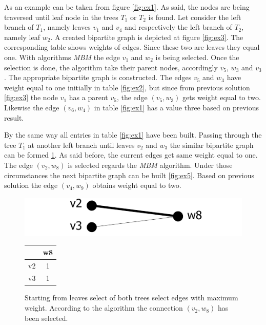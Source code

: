 \documentclass{report}
\begin{document}
As an example can be taken from figure \ref{fig:ex1}. As said, the nodes are being traversed until leaf node in the trees $ T_{1}$ or $ T_{2}$ is found. Let consider the left branch of $ T_{1}$, namely leaves $v_{1}$ and $v_{4}$ and respectively the left branch of $ T_{2}$, namely leaf $w_{2}$. A created bipartite graph is depicted at figure  \ref{fig:ex3}. The corresponding table shows weights of edges. Since these two are leaves they equal one. With algorithms \emph{MBM} the edge $v_{1}$ and $w_{2}$ is being selected. Once the selection is done, the algorithm take their parent nodes, accordingly $v_{5}$, $w_{3}$ and $v_{3}$. The appropriate bipartite graph is constructed. The edges  $v_{5}$ and $w_{3}$ have weight equal to one initially in table \ref{fig:ex2}, but since from previous solution \ref{fig:ex3}  the node $v_{1}$ has a parent $v_{5}$, the edge $(v_{5},w_{3})$ gets weight equal to two. Likewise the edge  $(v_{6},w_{4})$ in table \ref{fig:ex1} has a value three based on previous result.

By the same way all entries in table \ref{fig:ex1} have been built. Passing through the tree $ T_{1}$ at another left branch until leaves $v_{2}$ and $w_{3}$ the similar bipartite graph can be formed \ref{fig:ex6}. As said before, the current edges get same weight equal to one. The edge $(v_{2},w_{8})$ is selected regards the \emph{MBM} algorithm. Under those circumstances the next bipartite graph can be built \ref{fig:ex5}. Based on previous solution the edge $(v_{4},w_{9})$ obtains weight equal to two.

\begin{figure}[h]
  \begin{minipage}[h]{0.60\linewidth}
    \centering
    \includegraphics[scale=0.95]{Figures/algorithms/TD/6ex.pdf}\\[0.1cm]
  \end{minipage}%
  \begin{minipage}[b]{0.30\linewidth}
    \centering
\begin{tabular}{|c|c|}
\hline
   & w8 \\ \hline
v2 & \cellcolor[gray]{0.9} 1  \\ \hline
v3 & 1  \\ \hline
\end{tabular}
\end{minipage}
\caption{Starting from leaves select of both trees select edges with maximum weight. According to the algorithm the connection $(v_{2},w_{8})$ has been selected.}
\label{fig:ex6}
\end{figure}
\end{document}

